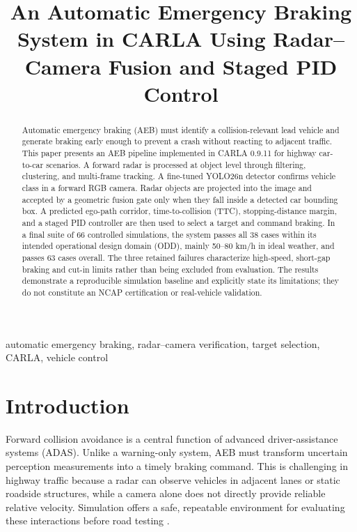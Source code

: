 \documentclass[conference]{IEEEtran}
\title{An Automatic Emergency Braking System in CARLA Using Radar--Camera Fusion and Staged PID Control}
\author{
\IEEEauthorblockN{Mai Viet Hoang and Duc An Pham}
\IEEEauthorblockA{
\textit{Hanoi University of Science and Technology}\\
Hanoi, Vietnam\\
hoangmai04222@gmail.com
}
}
\begin{document}
\maketitle

\begin{abstract}
Automatic emergency braking (AEB) must identify a collision-relevant lead
vehicle and generate braking early enough to prevent a crash without reacting to
adjacent traffic. This paper presents an AEB pipeline implemented in CARLA
0.9.11 for highway car-to-car scenarios. A forward radar is processed at object
level through filtering, clustering, and multi-frame tracking. A fine-tuned
YOLO26n detector confirms vehicle class in a forward RGB camera. Radar objects
are projected into the image and accepted by a geometric fusion gate only when
they fall inside a detected car bounding box. A predicted ego-path corridor,
time-to-collision (TTC), stopping-distance margin, and a staged PID controller
are then used to select a target and command braking. In a final suite of 66
controlled simulations, the system passes all 38 cases within its intended
operational design domain (ODD), mainly 50--80 km/h in ideal weather, and passes
63 cases overall. The three retained failures characterize high-speed,
short-gap braking and cut-in limits rather than being excluded from evaluation.
The results demonstrate a reproducible simulation baseline and explicitly state
its limitations; they do not constitute an NCAP certification or real-vehicle
validation.
\end{abstract}

\begin{IEEEkeywords}
automatic emergency braking, radar--camera verification, target selection,
CARLA, vehicle control
\end{IEEEkeywords}

\section{Introduction}
Forward collision avoidance is a central function of advanced driver-assistance
systems (ADAS). Unlike a warning-only system, AEB must transform uncertain
perception measurements into a timely braking command. This is challenging in
highway traffic because a radar can observe vehicles in adjacent lanes or static
roadside structures, while a camera alone does not directly provide reliable
relative velocity. Simulation offers a safe, repeatable environment for
evaluating these interactions before road testing \cite{dosovitskiy2017carla,carla_docs}.
\end{document}
